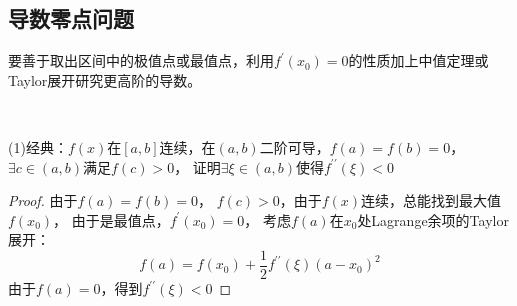 \subsection{导数零点问题}

要善于取出区间中的极值点或最值点，利用$f^{\prime}(x_0) = 0$的性质加上中值定理或Taylor展开研究更高阶的导数。

~

\begin{exercise}[几道经典导数零点问题]
  (1)经典：$f(x)$在$[a,b]$连续，在$(a,b)$二阶可导，$f(a) = f(b) = 0$，$\exists c \in (a,b)$满足$f(c) > 0$，
  证明$\exists \xi \in (a,b)$使得$f^{\prime\prime}(\xi) < 0$
\end{exercise}

\begin{proof}
  由于$f(a) = f(b) = 0$，
  $f(c) > 0$，由于$f(x)$连续，总能找到最大值$f(x_0)$，
  由于是最值点，$f^{\prime}(x_0) = 0$，
  考虑$f(a)$在$x_0$处Lagrange余项的Taylor展开：
  \begin{equation*}
    f(a) = f(x_0) + \frac{1}{2}f^{\prime\prime}(\xi) (a - x_0)^2
  \end{equation*}
  由于$f(a) = 0$，得到$f^{\prime\prime}(\xi) < 0$
\end{proof}





